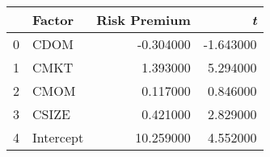 \begin{tabular}{llrr}
\toprule
 & Factor & Risk Premium & \emph{t} \\
\midrule
0 & CDOM & -0.304000 & -1.643000 \\
1 & CMKT & 1.393000 & 5.294000 \\
2 & CMOM & 0.117000 & 0.846000 \\
3 & CSIZE & 0.421000 & 2.829000 \\
4 & Intercept & 10.259000 & 4.552000 \\
\bottomrule
\end{tabular}
